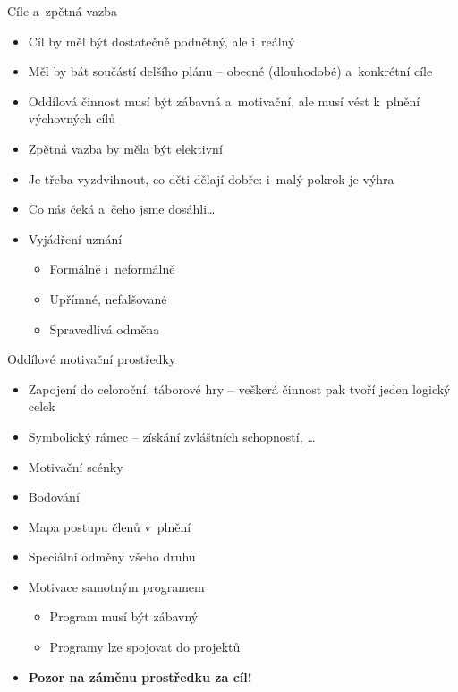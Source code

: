 \documentclass[compress,xelatex,xcolor=dvipsnames,print]{beamer}
\begin{document}
\begin{frame}{Cíle a~zpětná vazba}
\begin{multicols}{2}
\begin{itemize}
\item Cíl by měl být dostatečně podnětný, ale i~reálný
\item Měl by bát součástí delšího plánu -- obecné (dlouhodobé) a~konkrétní cíle
\item Oddílová činnost musí být zábavná a~motivační, ale musí vést k~plnění výchovných cílů
\end{itemize}
\columnbreak
\begin{itemize}
\item Zpětná vazba by měla být elektivní
\item Je třeba vyzdvihnout, co děti dělají dobře: i~malý pokrok je výhra
\item Co nás čeká a~čeho jsme dosáhli\ldots
\item Vyjádření uznání
 \begin{itemize}
 \item Formálně i~neformálně
 \item Upřímné, nefalšované
 \item Spravedlivá odměna
 \end{itemize}
\end{itemize}
\end{multicols}
\end{frame}

\begin{frame}{Oddílové motivační prostředky}
\begin{itemize}
\item Zapojení do celoroční, táborové hry -- veškerá činnost pak tvoří jeden logický celek
\item Symbolický rámec -- získání zvláštních schopností, \ldots
\item Motivační scénky
\item Bodování
\item Mapa postupu členů v~plnění
\item Speciální odměny všeho druhu
\item Motivace samotným programem
 \begin{itemize}
 \item Program musí být zábavný
 \item Programy lze spojovat do projektů
 \end{itemize}
\item \textbf{Pozor na záměnu prostředku za cíl!}
\end{itemize}
\end{frame}
\end{document}
